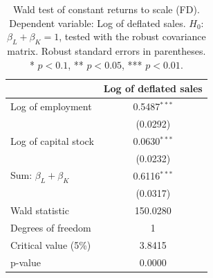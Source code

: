 \begin{table}[!htbp]
\centering
\begin{tabular}{lc}
\toprule
 & Log of deflated sales \\
\midrule
Log of employment & 0.5487$^{***}$ \\
 & (0.0292) \\
\addlinespace
Log of capital stock & 0.0630$^{***}$ \\
 & (0.0232) \\
\addlinespace
Sum: $\beta_L + \beta_K$ & 0.6116$^{***}$ \\
 & (0.0317) \\
\midrule
Wald statistic & 150.0280 \\
Degrees of freedom & 1 \\
Critical value (5\%) & 3.8415 \\
p-value & 0.0000 \\
\bottomrule
\end{tabular}
\caption{Wald test of constant returns to scale (FD). Dependent variable: Log of deflated sales. $H_0$: $\beta_L + \beta_K = 1$, tested with the robust covariance matrix. Robust standard errors in parentheses. * $p<0.1$, ** $p<0.05$, *** $p<0.01$.}
\label{tab:wald_test_crs_fd}
\end{table}
